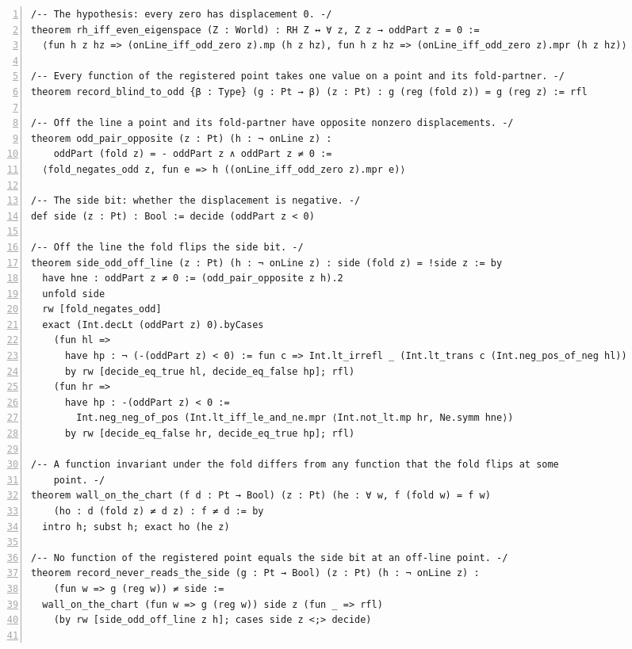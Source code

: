 \documentclass[10pt]{article}
\newcommand{\leansize}{\fontsize{5.5pt}{6.75pt}\selectfont}
\begin{document}
\begin{multicols}{2}
\begin{Verbatim}[numbers=left,firstnumber=1,numbersep=3pt,xleftmargin=2.6em,breaklines=true,breakanywhere=true,breakautoindent=false,breakindent=1.4em,breaksymbolleft={},breakanywheresymbolpre={},fontsize=\leansize]
/-- The hypothesis: every zero has displacement 0. -/
theorem rh_iff_even_eigenspace (Z : World) : RH Z ↔ ∀ z, Z z → oddPart z = 0 :=
  ⟨fun h z hz => (onLine_iff_odd_zero z).mp (h z hz), fun h z hz => (onLine_iff_odd_zero z).mpr (h z hz)⟩

/-- Every function of the registered point takes one value on a point and its fold-partner. -/
theorem record_blind_to_odd {β : Type} (g : Pt → β) (z : Pt) : g (reg (fold z)) = g (reg z) := rfl

/-- Off the line a point and its fold-partner have opposite nonzero displacements. -/
theorem odd_pair_opposite (z : Pt) (h : ¬ onLine z) :
    oddPart (fold z) = - oddPart z ∧ oddPart z ≠ 0 :=
  ⟨fold_negates_odd z, fun e => h ((onLine_iff_odd_zero z).mpr e)⟩

/-- The side bit: whether the displacement is negative. -/
def side (z : Pt) : Bool := decide (oddPart z < 0)

/-- Off the line the fold flips the side bit. -/
theorem side_odd_off_line (z : Pt) (h : ¬ onLine z) : side (fold z) = !side z := by
  have hne : oddPart z ≠ 0 := (odd_pair_opposite z h).2
  unfold side
  rw [fold_negates_odd]
  exact (Int.decLt (oddPart z) 0).byCases
    (fun hl =>
      have hp : ¬ (-(oddPart z) < 0) := fun c => Int.lt_irrefl _ (Int.lt_trans c (Int.neg_pos_of_neg hl))
      by rw [decide_eq_true hl, decide_eq_false hp]; rfl)
    (fun hr =>
      have hp : -(oddPart z) < 0 :=
        Int.neg_neg_of_pos (Int.lt_iff_le_and_ne.mpr ⟨Int.not_lt.mp hr, Ne.symm hne⟩)
      by rw [decide_eq_false hr, decide_eq_true hp]; rfl)

/-- A function invariant under the fold differs from any function that the fold flips at some
    point. -/
theorem wall_on_the_chart (f d : Pt → Bool) (z : Pt) (he : ∀ w, f (fold w) = f w)
    (ho : d (fold z) ≠ d z) : f ≠ d := by
  intro h; subst h; exact ho (he z)

/-- No function of the registered point equals the side bit at an off-line point. -/
theorem record_never_reads_the_side (g : Pt → Bool) (z : Pt) (h : ¬ onLine z) :
    (fun w => g (reg w)) ≠ side :=
  wall_on_the_chart (fun w => g (reg w)) side z (fun _ => rfl)
    (by rw [side_odd_off_line z h]; cases side z <;> decide)


\end{Verbatim}
\end{multicols}
\end{document}
